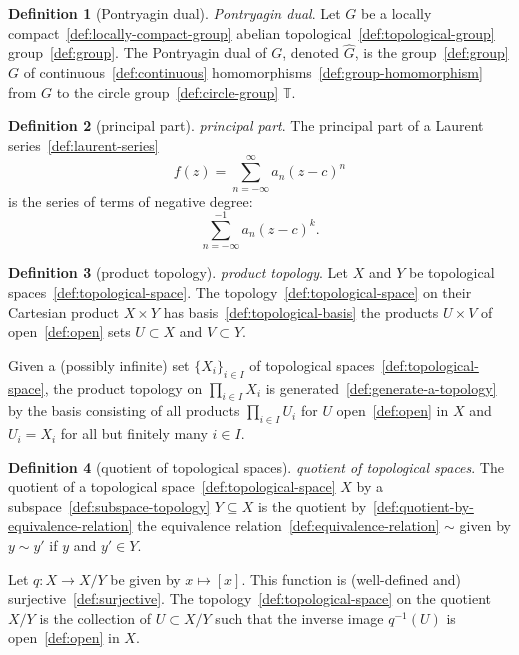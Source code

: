 \documentclass[12pt,a4paper]{article}
\theoremstyle{definition}
\newtheorem{definition}{Definition}
\begin{document}
\begin{definition}[Pontryagin dual]\label{def:pontryagin-dual}
\emph{Pontryagin dual}. Let $G$ be a locally compact~\ref{def:locally-compact-group} abelian topological~\ref{def:topological-group} group~\ref{def:group}. The Pontryagin dual of $G$, denoted $\widehat G$, is the group~\ref{def:group} $G$ of continuous~\ref{def:continuous} homomorphisms~\ref{def:group-homomorphism} from $G$ to the circle group~\ref{def:circle-group} $\mathbb T$.
\end{definition}

\begin{definition}[principal part]\label{def:principal-part}
\emph{principal part}. The principal part of a Laurent series~\ref{def:laurent-series} $$f(z) = \sum_{n=-\infty}^\infty a_n(z-c)^n$$ is the series of terms of negative degree: $$\sum_{n=-\infty}^{-1}a_n(z-c)^k.$$
\end{definition}

\begin{definition}[product topology]\label{def:product-topology}
\emph{product topology}. Let $X$ and $Y$ be topological spaces~\ref{def:topological-space}. The topology~\ref{def:topological-space} on their Cartesian product $X\times Y$ has basis~\ref{def:topological-basis} the products $U\times V$ of open~\ref{def:open} sets $U\subset X$ and $V\subset Y$.

Given a (possibly infinite) set $\{X_i\}_{i\in I}$ of topological spaces~\ref{def:topological-space}, the product topology on $\prod_{i\in I} X_i$ is generated~\ref{def:generate-a-topology} by the basis consisting of all products $\prod_{i\in I} U_i$ for $U$ open~\ref{def:open} in $X$ and $U_i = X_i$ for all but finitely many $i\in I$.
\end{definition}

\begin{definition}[quotient of topological spaces]\label{def:quotient-of-topological-spaces}
\emph{quotient of topological spaces}. The quotient of a topological space~\ref{def:topological-space} $X$ by a subspace~\ref{def:subspace-topology} $Y\subseteq X$ is the quotient by~\ref{def:quotient-by-equivalence-relation} the equivalence relation~\ref{def:equivalence-relation} $\sim$ given by $y\sim y'$ if $y$ and $y'\in Y$. 

Let $q: X\to X/Y$ be given by $x\mapsto [x]$. This function is (well-defined and) surjective~\ref{def:surjective}. The topology~\ref{def:topological-space} on the quotient $X/Y$ is the collection of $U\subset X/Y$ such that the inverse image $q^{-1}(U)$ is open~\ref{def:open} in $X$.
\end{definition}
\end{document}
